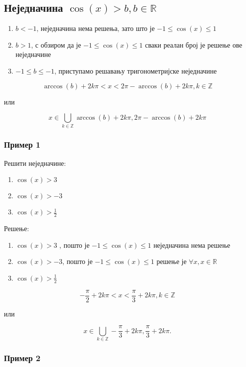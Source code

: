 \documentclass[../diplomski.tex]{subfiles}
\begin{document}
\subsection{Неједначина $\cos(x)>b, b\in\mathbb{R}$}

\begin{enumerate}[label=\alph*)]
\item $b<-1$, неједначина нема решења, зато што је $-1\leq\cos(x)\leq1$
\item $b>1$, с обзиром да је $-1\leq\cos(x)\leq1$ сваки реалан број је решење ове неједначине
\item $-1\leq b\leq-1$, приступамо решавању тригонометријске неједначине
\end{enumerate}



\[\arccos(b)+2k\pi<x<2\pi-\arccos(b)+2k\pi,k\in\mathbb{Z}\]
\centerline{или}
\[x\in\bigcup_{k\in\mathbb{Z}}\arccos(b)+2k\pi,2\pi-\arccos(b)+2k\pi\]

\subsubsection{Пример 1}

Решити неједначине:

\begin{enumerate}[label=\alph*)]
\item $\cos(x)>3$
\item $\cos(x)>-3$
\item $\cos(x)>\frac{1}{2}$
\end{enumerate}

Решење:

\begin{enumerate}[label=\alph*)]
\item $\cos(x)>3$ , пошто је $-1\leqslant\cos(x)\leqslant1$ неједначина нема решење
\item $\cos(x)>-3$, пошто је $-1\leqslant\cos(x)\leqslant1$ решење је $\forall x,x\in\mathbb{R}$
\item $\cos(x)>\frac{1}{2}$
\end{enumerate}



\[-\frac{\pi}{2}+2k\pi<x<\frac{\pi}{3}+2k\pi,k\in\mathbb{Z}\]
\centerline{или}
\[x\in\bigcup_{k\in\mathbb{Z}}-\frac{\pi}{3}+2k\pi,\frac{\pi}{3}+2k\pi.\]


\subsubsection{Пример 2}
\end{document}
